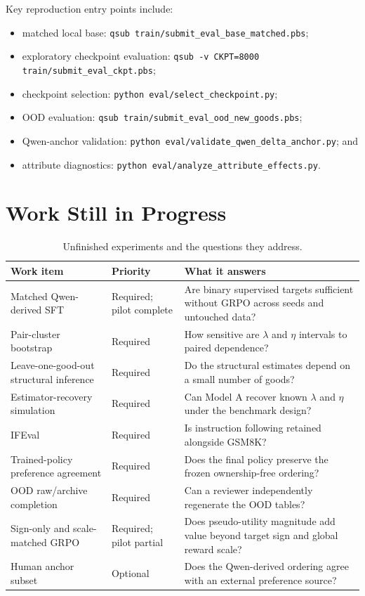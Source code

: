 \documentclass[11pt,letterpaper]{article}
\begin{document}
Key reproduction entry points include:
\begin{itemize}
    \item matched local base: \texttt{qsub train/submit\_eval\_base\_matched.pbs};
    \item exploratory checkpoint evaluation: \texttt{qsub -v CKPT=8000 train/submit\_eval\_ckpt.pbs};
    \item checkpoint selection: \texttt{python eval/select\_checkpoint.py};
    \item OOD evaluation: \texttt{qsub train/submit\_eval\_ood\_new\_goods.pbs};
    \item Qwen-anchor validation: \texttt{python eval/validate\_qwen\_delta\_anchor.py}; and
    \item attribute diagnostics: \texttt{python eval/analyze\_attribute\_effects.py}.
\end{itemize}

\FloatBarrier
\section{Work Still in Progress}

\begin{table}[!htbp]
\centering
\small
\begin{tabular}{p{}p{}p{}}
\toprule
Work item & Priority & What it answers \\
\midrule
Matched Qwen-derived SFT & Required; pilot complete & Are binary supervised targets sufficient without GRPO across seeds and untouched data? \\
Pair-cluster bootstrap & Required & How sensitive are $\lambda$ and $\eta$ intervals to paired dependence? \\
Leave-one-good-out structural inference & Required & Do the structural estimates depend on a small number of goods? \\
Estimator-recovery simulation & Required & Can Model A recover known $\lambda$ and $\eta$ under the benchmark design? \\
IFEval & Required & Is instruction following retained alongside GSM8K? \\
Trained-policy preference agreement & Required & Does the final policy preserve the frozen ownership-free ordering? \\
OOD raw/archive completion & Required & Can a reviewer independently regenerate the OOD tables? \\
Sign-only and scale-matched GRPO & Required; pilot partial & Does pseudo-utility magnitude add value beyond target sign and global reward scale? \\
Human anchor subset & Optional & Does the Qwen-derived ordering agree with an external preference source? \\
\bottomrule
\end{tabular}
\caption{Unfinished experiments and the questions they address.}
\label{tab:pending}
\end{table}
\end{document}
